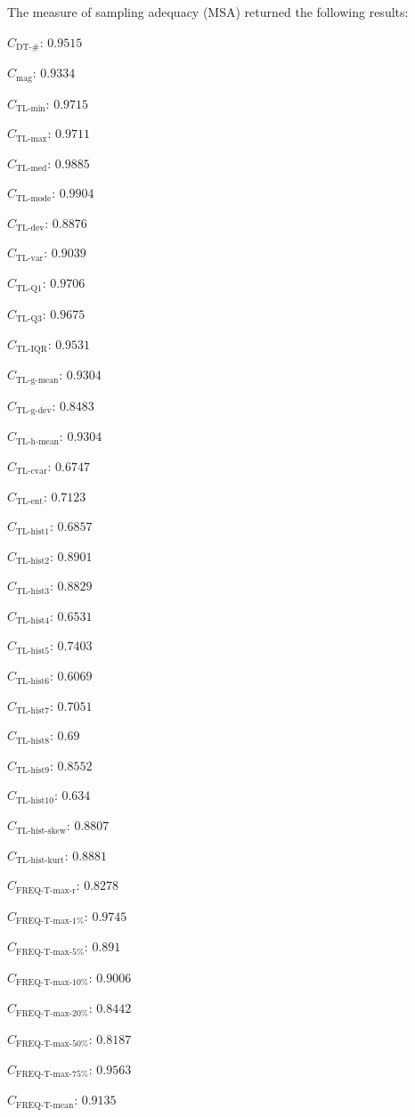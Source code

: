 \documentclass[a4paper]{article}
\newcommand{\magnitudename}{\text{mag}}
\newcommand{\magnitude}{C_{\magnitudename}}
\newcommand{\tlminname}{\text{TL-min}}
\newcommand{\tlmin}{C_{\tlminname}}
\newcommand{\tlmaxname}{\text{TL-max}}
\newcommand{\tlmax}{C_{\tlmaxname}}
\newcommand{\tlmedname}{\text{TL-med}}
\newcommand{\tlmed}{C_{\tlmedname}}
\newcommand{\tlmodename}{\text{TL-mode}}
\newcommand{\tlmode}{C_{\tlmodename}}
\newcommand{\tldevname}{\text{TL-dev}}
\newcommand{\tldev}{C_{\tldevname}}
\newcommand{\tlvarname}{\text{TL-var}}
\newcommand{\tlvar}{C_{\tlvarname}}
\newcommand{\tlqonename}{\text{TL-Q1}}
\newcommand{\tlqone}{C_{\tlqonename}}
\newcommand{\tlqthreename}{\text{TL-Q3}}
\newcommand{\tlqthree}{C_{\tlqthreename}}
\newcommand{\tliqrname}{\text{TL-IQR}}
\newcommand{\tliqr}{C_{\tliqrname}}
\newcommand{\tlgmeanname}{\text{TL-g-mean}}
\newcommand{\tlgmean}{C_{\tlgmeanname}}
\newcommand{\tlgdevname}{\text{TL-g-dev}}
\newcommand{\tlgdev}{C_{\tlgdevname}}
\newcommand{\tlhmeanname}{\text{TL-h-mean}}
\newcommand{\tlhmean}{C_{\tlhmeanname}}
\newcommand{\tlcvariationname}{\text{TL-cvar}}
\newcommand{\tlcvariation}{C_{\tlcvariationname}}
\newcommand{\tlentropyname}{\text{TL-ent}}
\newcommand{\tlentropy}{C_{\tlentropyname}}
\newcommand{\tlhistonename}{\text{TL-hist1}}
\newcommand{\tlhistone}{C_{\tlhistonename}}
\newcommand{\tlhisttwoname}{\text{TL-hist2}}
\newcommand{\tlhisttwo}{C_{\tlhisttwoname}}
\newcommand{\tlhistthreename}{\text{TL-hist3}}
\newcommand{\tlhistthree}{C_{\tlhistthreename}}
\newcommand{\tlhistfourname}{\text{TL-hist4}}
\newcommand{\tlhistfour}{C_{\tlhistfourname}}
\newcommand{\tlhistfivename}{\text{TL-hist5}}
\newcommand{\tlhistfive}{C_{\tlhistfivename}}
\newcommand{\tlhistsixname}{\text{TL-hist6}}
\newcommand{\tlhistsix}{C_{\tlhistsixname}}
\newcommand{\tlhistsevenname}{\text{TL-hist7}}
\newcommand{\tlhistseven}{C_{\tlhistsevenname}}
\newcommand{\tlhisteightname}{\text{TL-hist8}}
\newcommand{\tlhisteight}{C_{\tlhisteightname}}
\newcommand{\tlhistninename}{\text{TL-hist9}}
\newcommand{\tlhistnine}{C_{\tlhistninename}}
\newcommand{\tlhisttenname}{\text{TL-hist10}}
\newcommand{\tlhistten}{C_{\tlhisttenname}}
\newcommand{\tlskewhistname}{\text{TL-hist-skew}}
\newcommand{\tlskewhist}{C_{\tlskewhistname}}
\newcommand{\tlkurthistname}{\text{TL-hist-kurt}}
\newcommand{\tlkurthist}{C_{\tlkurthistname}}
\newcommand{\freqmaxrname}{\text{FREQ-T-max-r}}
\newcommand{\freqmaxr}{C_{\freqmaxrname}}
\newcommand{\freqmaxonename}{\text{FREQ-T-max-1\%}}
\newcommand{\freqmaxone}{C_{\freqmaxonename}}
\newcommand{\freqmaxfivename}{\text{FREQ-T-max-5\%}}
\newcommand{\freqmaxfive}{C_{\freqmaxfivename}}
\newcommand{\freqmaxtenname}{\text{FREQ-T-max-10\%}}
\newcommand{\freqmaxten}{C_{\freqmaxtenname}}
\newcommand{\freqmaxtwentyname}{\text{FREQ-T-max-20\%}}
\newcommand{\freqmaxtwenty}{C_{\freqmaxtwentyname}}
\newcommand{\freqmaxfiftyname}{\text{FREQ-T-max-50\%}}
\newcommand{\freqmaxfifty}{C_{\freqmaxfiftyname}}
\newcommand{\freqmaxseventyfivename}{\text{FREQ-T-max-75\%}}
\newcommand{\freqmaxseventyfive}{C_{\freqmaxseventyfivename}}
\newcommand{\freqmeanname}{\text{FREQ-T-mean}}
\newcommand{\freqmean}{C_{\freqmeanname}}
\newcommand{\numberuniquetracesname}{\text{DT-\#}}
\newcommand{\numberuniquetraces}{C_{\numberuniquetracesname}}
\begin{document}
\noindent
The measure of sampling adequacy (MSA) returned the following results:
\begin{compactitem}
\item $\numberuniquetraces$: $0.9515$
\item $\magnitude$: $0.9334$
\item $\tlmin$: $0.9715$
\item $\tlmax$: $0.9711$
\item $\tlmed$: $0.9885$
\item $\tlmode$: $0.9904$
\item $\tldev$: $0.8876$
\item $\tlvar$: $0.9039$
\item $\tlqone$: $0.9706$
\item $\tlqthree$: $0.9675$
\item $\tliqr$: $0.9531$
\item $\tlgmean$: $0.9304$
\item $\tlgdev$: $0.8483$
\item $\tlhmean$: $0.9304$
\item $\tlcvariation$: $0.6747$
\item $\tlentropy$: $0.7123$
\item $\tlhistone$: $0.6857$
\item $\tlhisttwo$: $0.8901$
\item $\tlhistthree$: $0.8829$
\item $\tlhistfour$: $0.6531$
\item $\tlhistfive$: $0.7403$
\item $\tlhistsix$: $0.6069$
\item $\tlhistseven$: $0.7051$
\item $\tlhisteight$: $0.69$
\item $\tlhistnine$: $0.8552$
\item $\tlhistten$: $0.634$
\item $\tlskewhist$: $0.8807$
\item $\tlkurthist$: $0.8881$
\item $\freqmaxr$: $0.8278$
\item $\freqmaxone$: $0.9745$
\item $\freqmaxfive$: $0.891$
\item $\freqmaxten$: $0.9006$
\item $\freqmaxtwenty$: $0.8442$
\item $\freqmaxfifty$: $0.8187$
\item $\freqmaxseventyfive$: $0.9563$
\item $\freqmean$: $0.9135$

\end{compactitem}
\end{document}
